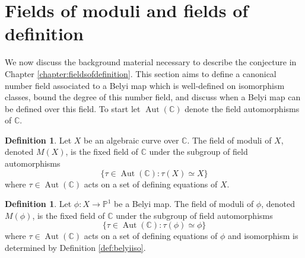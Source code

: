 \documentclass{dcthesis}
\newcommand{\PP}{\mathbb P}
\newcommand{\CC}{\mathbb C}
\newcommand{\defi}[1]{\textsf{#1}}
\DeclareMathOperator{\Aut}{Aut}
\numberwithin{equation}{section}
\theoremstyle{definition}
\newtheorem{definition}[equation]{Definition}
\theoremstyle{remark}
\begin{document}
{{  \section{Fields of moduli and fields of definition}{\label{sec:fieldsofmodulifieldsofdefinition}
    We now discuss the background
    material necessary to describe
    the conjecture in
    Chapter \ref{chapter:fieldsofdefinition}.
    This section aims
    to define a canonical number field
    associated to a Belyi map
    which is well-defined on isomorphism classes,
    bound the degree of this number field,
    and discuss when a Belyi map can be defined
    over this field.
    To start let $\Aut(\CC)$ denote the
    field automorphisms of $\CC$.
    \begin{definition}
      \label{def:fieldofmoduli}
      Let $X$ be an algebraic curve over $\CC$.
      The \defi{field of moduli} of $X$,
      denoted $M(X)$,
      is the fixed field of $\CC$ under
      the subgroup of field automorphisms
      \begin{equation}
        \label{eqn:fixedfield}
        \{\tau\in\Aut(\CC) : \tau(X)\simeq X\}
      \end{equation}
      where $\tau\in\Aut(\CC)$ acts on
      a set of defining equations of $X$.
    \end{definition}
    \begin{definition}
      \label{def:fieldofmodulibelyimap}
      Let $\phi\colon X\to\PP^1$ be a Belyi map.
      The \defi{field of moduli} of $\phi$,
      denoted $M(\phi)$,
      is the fixed field of $\CC$ under
      the subgroup of
      field automorphisms
      \begin{equation}
        \label{eqn:fixedfieldphi}
        \{\tau\in\Aut(\CC) : \tau(\phi)\simeq\phi\}
      \end{equation}
      where $\tau\in\Aut(\CC)$ acts on
      a set of defining equations of $\phi$
      and isomorphism is determined by
      Definition \ref{def:belyiiso}.
    \end{definition}
}}}
\end{document}
